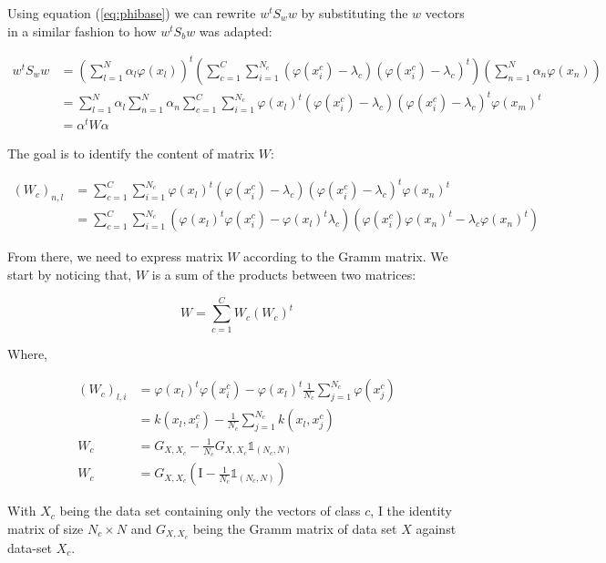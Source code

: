 Using equation (\ref{eq:phibase}) we can rewrite $w^tS_ww$ by substituting the $w$ vectors in a similar fashion
to how $w^tS_bw$ was adapted:

\begin{align*}
  w^tS_ww &= \left( \sum_{l=1}^N \alpha_l \varphi(x_l)\right)^t
             \left( \sum_{c=1}^C \sum_{i=1}^{N_c} (\varphi(x_i^c) - \lambda_c) (\varphi(x_i^c) - \lambda_c)^t\right) \left( \sum_{n=1}^N \alpha_n \varphi(x_n)\right) \\
          &= \sum_{l=1}^N \alpha_l \sum_{n=1}^N \alpha_n \sum_{c=1}^C
          \sum_{i=1}^{N_c} \varphi(x_l)^t(\varphi(x_i^c) - \lambda_c)
                                 (\varphi(x_i^c) - \lambda_c)^t  \varphi(x_m)^t\\
&= \alpha^tW\alpha
\end{align*}


The goal is to identify the content of matrix $W$:

\begin{align*}
  (W_c)_{n,l} &= \sum_{c=1}^C \sum_{i=1}^{N_c}
                  \varphi(x_l)^t(\varphi(x_i^c) - \lambda_c)(\varphi(x_i^c) - \lambda_c)^t\varphi(x_n)^t \\
            &= \sum_{c=1}^C \sum_{i=1}^{N_c} (\varphi(x_l)^t\varphi(x_i^c) -
            \varphi(x_l)^t\lambda_c) (\varphi(x_i^c)\varphi(x_n)^t -
            \lambda_c \varphi(x_n)^t)
\end{align*}

From there, we need to express matrix $W$ according to the Gramm matrix. We start by noticing that,
$W$ is a sum of the products between two matrices:

\begin{equation*}
W = \sum_{c=1}^C W_c (W_c)^t
\end{equation*}

Where,

\begin{align*}
  (W_c)_{l, i} &= \varphi(x_l)^t\varphi(x_i^c) - \varphi(x_l)^t \frac{1}{N_c}\sum_{j=1}^{N_c}\varphi(x_j^c) \\
             &= k(x_l, x_i^c) - \frac{1}{N_c}\sum_{j=1}^{N_c}k(x_l, x_j^c) \\
   W_c       &= G_{X, X_c} - \frac{1}{N_c} G_{X, X_c} \mathds{1}_{(N_c, N)} \\
   W_c       &= G_{X, X_c} \left(\textrm{I} - \frac{1}{N_c}\mathds{1}_{(N_c, N)}\right)
\end{align*}

With $X_c$ being the data set containing only the vectors of class $c$, $\textrm{I}$ the identity matrix of
size $N_c \times N$ and
$G_{X, X_c}$ being the Gramm matrix of data set $X$ against data-set $X_c$.

